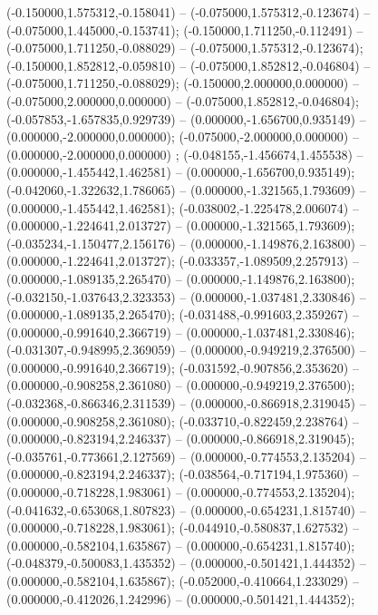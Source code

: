  (-0.150000,1.575312,-0.158041) -- (-0.075000,1.575312,-0.123674) -- (-0.075000,1.445000,-0.153741);
 (-0.150000,1.711250,-0.112491) -- (-0.075000,1.711250,-0.088029) -- (-0.075000,1.575312,-0.123674);
 (-0.150000,1.852812,-0.059810) -- (-0.075000,1.852812,-0.046804) -- (-0.075000,1.711250,-0.088029);
 (-0.150000,2.000000,0.000000) -- (-0.075000,2.000000,0.000000) -- (-0.075000,1.852812,-0.046804);
 (-0.057853,-1.657835,0.929739) -- (0.000000,-1.656700,0.935149) -- (0.000000,-2.000000,0.000000);
 (-0.075000,-2.000000,0.000000) -- (0.000000,-2.000000,0.000000) ;
 (-0.048155,-1.456674,1.455538) -- (0.000000,-1.455442,1.462581) -- (0.000000,-1.656700,0.935149);
 (-0.042060,-1.322632,1.786065) -- (0.000000,-1.321565,1.793609) -- (0.000000,-1.455442,1.462581);
 (-0.038002,-1.225478,2.006074) -- (0.000000,-1.224641,2.013727) -- (0.000000,-1.321565,1.793609);
 (-0.035234,-1.150477,2.156176) -- (0.000000,-1.149876,2.163800) -- (0.000000,-1.224641,2.013727);
 (-0.033357,-1.089509,2.257913) -- (0.000000,-1.089135,2.265470) -- (0.000000,-1.149876,2.163800);
 (-0.032150,-1.037643,2.323353) -- (0.000000,-1.037481,2.330846) -- (0.000000,-1.089135,2.265470);
 (-0.031488,-0.991603,2.359267) -- (0.000000,-0.991640,2.366719) -- (0.000000,-1.037481,2.330846);
 (-0.031307,-0.948995,2.369059) -- (0.000000,-0.949219,2.376500) -- (0.000000,-0.991640,2.366719);
 (-0.031592,-0.907856,2.353620) -- (0.000000,-0.908258,2.361080) -- (0.000000,-0.949219,2.376500);
 (-0.032368,-0.866346,2.311539) -- (0.000000,-0.866918,2.319045) -- (0.000000,-0.908258,2.361080);
 (-0.033710,-0.822459,2.238764) -- (0.000000,-0.823194,2.246337) -- (0.000000,-0.866918,2.319045);
 (-0.035761,-0.773661,2.127569) -- (0.000000,-0.774553,2.135204) -- (0.000000,-0.823194,2.246337);
 (-0.038564,-0.717194,1.975360) -- (0.000000,-0.718228,1.983061) -- (0.000000,-0.774553,2.135204);
 (-0.041632,-0.653068,1.807823) -- (0.000000,-0.654231,1.815740) -- (0.000000,-0.718228,1.983061);
 (-0.044910,-0.580837,1.627532) -- (0.000000,-0.582104,1.635867) -- (0.000000,-0.654231,1.815740);
 (-0.048379,-0.500083,1.435352) -- (0.000000,-0.501421,1.444352) -- (0.000000,-0.582104,1.635867);
 (-0.052000,-0.410664,1.233029) -- (0.000000,-0.412026,1.242996) -- (0.000000,-0.501421,1.444352);
